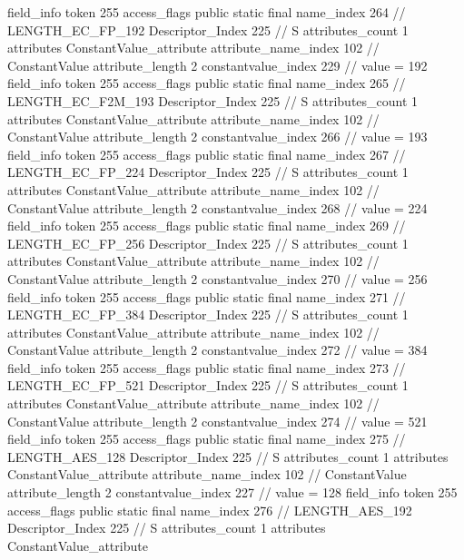 {{{{{{{				}
				}
			}
			field_info {
				token	255
				access_flags	public static final
				name_index	264		// LENGTH_EC_FP_192
				Descriptor_Index	225		// S
				attributes_count	1
				attributes {
				ConstantValue_attribute {
					attribute_name_index	102		// ConstantValue
					attribute_length	2
					constantvalue_index	229		// value = 192
				}
				}
			}
			field_info {
				token	255
				access_flags	public static final
				name_index	265		// LENGTH_EC_F2M_193
				Descriptor_Index	225		// S
				attributes_count	1
				attributes {
				ConstantValue_attribute {
					attribute_name_index	102		// ConstantValue
					attribute_length	2
					constantvalue_index	266		// value = 193
				}
				}
			}
			field_info {
				token	255
				access_flags	public static final
				name_index	267		// LENGTH_EC_FP_224
				Descriptor_Index	225		// S
				attributes_count	1
				attributes {
				ConstantValue_attribute {
					attribute_name_index	102		// ConstantValue
					attribute_length	2
					constantvalue_index	268		// value = 224
				}
				}
			}
			field_info {
				token	255
				access_flags	public static final
				name_index	269		// LENGTH_EC_FP_256
				Descriptor_Index	225		// S
				attributes_count	1
				attributes {
				ConstantValue_attribute {
					attribute_name_index	102		// ConstantValue
					attribute_length	2
					constantvalue_index	270		// value = 256
				}
				}
			}
			field_info {
				token	255
				access_flags	public static final
				name_index	271		// LENGTH_EC_FP_384
				Descriptor_Index	225		// S
				attributes_count	1
				attributes {
				ConstantValue_attribute {
					attribute_name_index	102		// ConstantValue
					attribute_length	2
					constantvalue_index	272		// value = 384
				}
				}
			}
			field_info {
				token	255
				access_flags	public static final
				name_index	273		// LENGTH_EC_FP_521
				Descriptor_Index	225		// S
				attributes_count	1
				attributes {
				ConstantValue_attribute {
					attribute_name_index	102		// ConstantValue
					attribute_length	2
					constantvalue_index	274		// value = 521
				}
				}
			}
			field_info {
				token	255
				access_flags	public static final
				name_index	275		// LENGTH_AES_128
				Descriptor_Index	225		// S
				attributes_count	1
				attributes {
				ConstantValue_attribute {
					attribute_name_index	102		// ConstantValue
					attribute_length	2
					constantvalue_index	227		// value = 128
				}
				}
			}
			field_info {
				token	255
				access_flags	public static final
				name_index	276		// LENGTH_AES_192
				Descriptor_Index	225		// S
				attributes_count	1
				attributes {
				ConstantValue_attribute {
}}}}}}}
